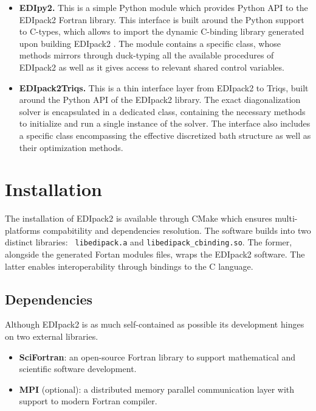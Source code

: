 \documentclass[final,3p,10pt]{elsarticle}
\def\NAME{{\rm EDIpack2 }}
\begin{document}
\begin{itemize}
\item{\bf EDIpy2.}
This is a simple Python module which provides Python API to the
\NAME Fortran library. This interface is built around the Python
support to C-types, which allows to import the dynamic C-binding
library generated upon building \NAME. The module contains a specific
class, whose methods mirrors through  duck-typing all the available
procedures of \NAME as well as it gives access to relevant shared
control variables.




\item{\bf EDIpack2Triqs.}
This is a thin interface layer from \NAME to Triqs,
built around the Python API of the \NAME library. The exact
diagonalization solver is encapsulated in a dedicated class,
containing the necessary methods to initialize and run a single
instance of the solver. The interface also includes a specific class
encompassing the effective discretized bath structure as well as their 
optimization methods.  

  
\end{itemize}








\section{Installation}\label{SecInstall}
The installation of \NAME is available through CMake which ensures
multi-platforms compabitility and dependencies resolution.  
The software builds into two distinct libraries: {\tt
  libedipack.a} and {\tt libedipack\_cbinding.so}.
The former, alongside the generated Fortan modules files,
wraps the \NAME software. The latter enables interoperability through
bindings to the C language.    

\subsection{Dependencies}
Although \NAME is as much self-contained as possible its development
hinges on two external libraries.
\begin{itemize}
\item {\bf SciFortran}: an open-source Fortran library to support
  mathematical and scientific software development. 
\item {\bf MPI} (optional): a distributed memory parallel communication layer with support to modern Fortran compiler.
\end{itemize}
 
\end{document}
